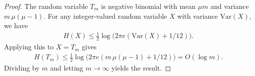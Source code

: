 \documentclass[onecolumn]{IEEEtran}
\theoremstyle{definition}
\begin{document}
\begin{proof}
The random variable \(T_m\) is negative binomial with mean \(\mu m\) and variance \(m\,\mu(\mu-1)\). For any integer-valued random variable \(X\) with variance $\mathrm{Var}(X)$, we have \cite{Massey1988}
\begin{align*}
    H(X)\le \frac{1}{2}\log\!\bigl(2\pi e(\mathrm{Var}(X)+1/12)\bigr).
\end{align*}
Applying this to \(X=T_m\) gives
\begin{align*}
    H(T_m)
    \le
    \frac{1}{2}\log\!\bigl(2\pi e(m\,\mu(\mu-1)+1/12)\bigr)
    = O(\log m).
\end{align*}
Dividing by \(m\) and letting \(m\to\infty\) yields the result.
\end{proof}




\end{document}

